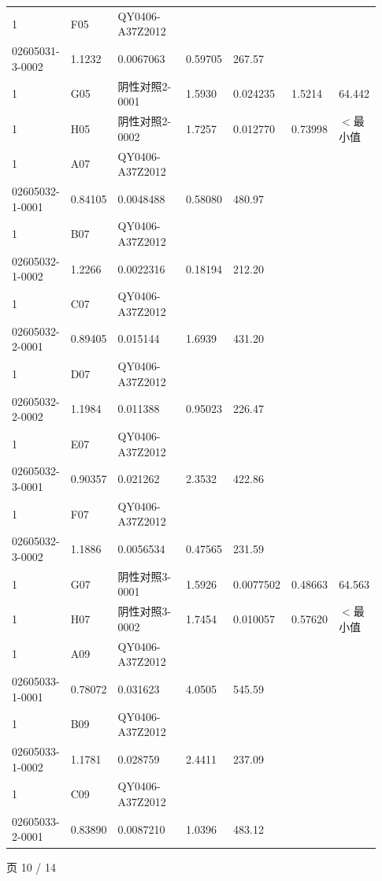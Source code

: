 \documentclass[UTF8,10pt,a4paper,fontset=fandol]{ctexart}
\begin{document}
\begin{tabular}{@{}p{0.06\linewidth}p{0.07\linewidth}p{0.29\linewidth}p{0.13\linewidth}p{0.13\linewidth}p{0.13\linewidth}p{0.12\linewidth}@{}}
1 & F05 & QY0406-A37Z2012\\[-2pt]02605031-3-0002 & 1.1232 & 0.0067063 & 0.59705 & 267.57 \\
1 & G05 & 阴性对照2-0001 & 1.5930 & 0.024235 & 1.5214 & 64.442 \\
1 & H05 & 阴性对照2-0002 & 1.7257 & 0.012770 & 0.73998 & $<$最小值 \\
1 & A07 & QY0406-A37Z2012\\[-2pt]02605032-1-0001 & 0.84105 & 0.0048488 & 0.58080 & 480.97 \\
\hline
1 & B07 & QY0406-A37Z2012\\[-2pt]02605032-1-0002 & 1.2266 & 0.0022316 & 0.18194 & 212.20 \\
1 & C07 & QY0406-A37Z2012\\[-2pt]02605032-2-0001 & 0.89405 & 0.015144 & 1.6939 & 431.20 \\
1 & D07 & QY0406-A37Z2012\\[-2pt]02605032-2-0002 & 1.1984 & 0.011388 & 0.95023 & 226.47 \\
1 & E07 & QY0406-A37Z2012\\[-2pt]02605032-3-0001 & 0.90357 & 0.021262 & 2.3532 & 422.86 \\
1 & F07 & QY0406-A37Z2012\\[-2pt]02605032-3-0002 & 1.1886 & 0.0056534 & 0.47565 & 231.59 \\
1 & G07 & 阴性对照3-0001 & 1.5926 & 0.0077502 & 0.48663 & 64.563 \\
1 & H07 & 阴性对照3-0002 & 1.7454 & 0.010057 & 0.57620 & $<$最小值 \\
1 & A09 & QY0406-A37Z2012\\[-2pt]02605033-1-0001 & 0.78072 & 0.031623 & 4.0505 & 545.59 \\
1 & B09 & QY0406-A37Z2012\\[-2pt]02605033-1-0002 & 1.1781 & 0.028759 & 2.4411 & 237.09 \\
1 & C09 & QY0406-A37Z2012\\[-2pt]02605033-2-0001 & 0.83890 & 0.0087210 & 1.0396 & 483.12 \\
\hline
\end{tabular}


\newpage

\begin{flushright}
页 10 / 14
\end{flushright}
\end{document}
